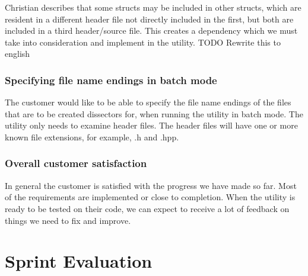 Christian describes that some structs may be included in other structs, which are resident in a different header file
not directly included in the  first, but both are included in a third header/source file. This creates a dependency which we must take
into consideration and implement in the utility.
TODO Rewrite this to english

\subsubsection{Specifying file name endings in batch mode}

The customer would like to be able to specify the file name endings of the files that are to be created dissectors for,
when running the utility in batch mode. The utility only needs to examine header files. The header files will have one or more known
file extensions, for example, .h and .hpp.

\subsubsection{Overall customer satisfaction}

In general the customer is satisfied with the progress we have made so far. Most of the requirements are
implemented or close to completion. When the utility is ready to be tested on their code, we can expect to receive
a lot of feedback on things we need to fix and improve.


















\section{Sprint Evaluation}


